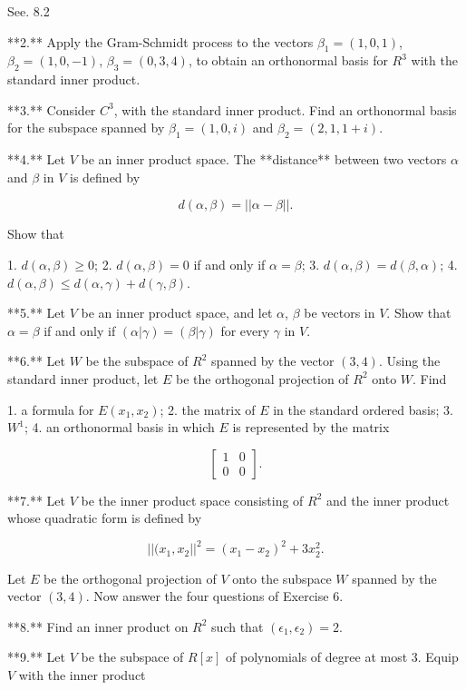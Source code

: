 See. 8.2

**2.** Apply the Gram-Schmidt process to the vectors \(\beta_{1}=(1,0,1)\), \(\beta_{2}=(1,0,-1)\), \(\beta_{3}=(0,3,4)\), to obtain an orthonormal basis for \(R^{3}\) with the standard inner product.

**3.** Consider \(C^{3}\), with the standard inner product. Find an orthonormal basis for the subspace spanned by \(\beta_{1}=(1,0,i)\) and \(\beta_{2}=(2,1,1+i)\).

**4.** Let \(V\) be an inner product space. The **distance** between two vectors \(\alpha\) and \(\beta\) in \(V\) is defined by

\[d(\alpha,\beta)=||\alpha-\beta||.\]

Show that

1. \(d(\alpha,\beta)\geq 0\);
2. \(d(\alpha,\beta)=0\) if and only if \(\alpha=\beta\);
3. \(d(\alpha,\beta)=d(\beta,\alpha)\);
4. \(d(\alpha,\beta)\leq d(\alpha,\gamma)+d(\gamma,\beta)\).

**5.** Let \(V\) be an inner product space, and let \(\alpha\), \(\beta\) be vectors in \(V\). Show that \(\alpha=\beta\) if and only if \((\alpha|\gamma)=(\beta|\gamma)\) for every \(\gamma\) in \(V\).

**6.** Let \(W\) be the subspace of \(R^{2}\) spanned by the vector \((3,4)\). Using the standard inner product, let \(E\) be the orthogonal projection of \(R^{2}\) onto \(W\). Find

1. a formula for \(E(x_{1},x_{2})\);
2. the matrix of \(E\) in the standard ordered basis;
3. \(W^{1}\);
4. an orthonormal basis in which \(E\) is represented by the matrix

\[\begin{bmatrix}1&0\\ 0&0\end{bmatrix}.\]

**7.** Let \(V\) be the inner product space consisting of \(R^{2}\) and the inner product whose quadratic form is defined by

\[||(x_{1},x_{2}||^{2}=(x_{1}-x_{2})^{2}+3x_{2}^{2}.\]

Let \(E\) be the orthogonal projection of \(V\) onto the subspace \(W\) spanned by the vector \((3,4)\). Now answer the four questions of Exercise 6.

**8.** Find an inner product on \(R^{2}\) such that \((\epsilon_{1},\epsilon_{2})=2\).

**9.** Let \(V\) be the subspace of \(R[x]\) of polynomials of degree at most \(3\). Equip \(V\) with the inner product

